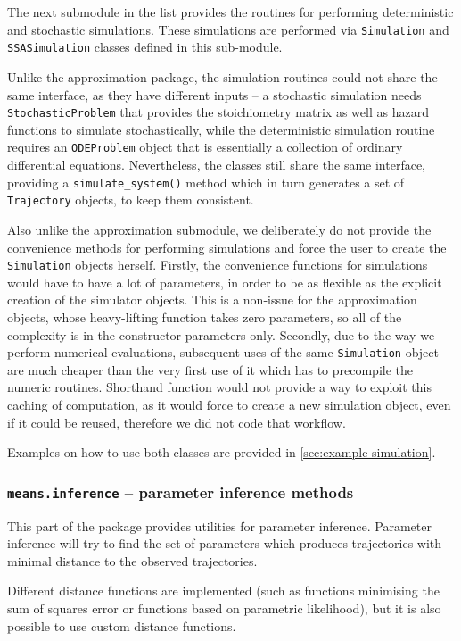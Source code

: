 The next submodule in the list provides the routines for performing deterministic and stochastic simulations.
These simulations are performed via \verb"Simulation" and \verb"SSASimulation" classes defined in this sub-module.

Unlike the approximation package, the simulation routines could not share the same interface, as they have different inputs -- a stochastic simulation needs \verb"StochasticProblem" that provides the stoichiometry matrix as well as hazard functions to simulate stochastically, while the deterministic simulation routine requires an \verb"ODEProblem" object that is essentially a collection of ordinary differential equations.
Nevertheless, the classes still share the same interface, providing a \verb"simulate_system()" method which in turn generates a set of \verb"Trajectory" objects, to keep them consistent.

Also unlike the approximation submodule, we deliberately do not provide the convenience methods for performing simulations and force the user to create the \verb"Simulation" objects herself. 
Firstly, the convenience functions for simulations would have to have a lot of parameters, in order to be as flexible as the explicit creation of the simulator objects. 
This is a non-issue for the approximation objects, whose heavy-lifting function takes zero parameters, so all of the complexity is in the constructor parameters only.
Secondly, due to the way we perform numerical evaluations, subsequent uses of the same \verb"Simulation" object are much cheaper than the very first use of it which has to precompile the numeric routines. 
Shorthand function would not provide a way to exploit this caching of computation, as it would force to create a new simulation object, even if it could be reused, therefore we did not code that workflow.

Examples on how to use both classes are provided in \autoref{sec:example-simulation}.

\subsubsection{{\tt means.inference} -- parameter inference methods}
This part of the package provides utilities for parameter inference.
Parameter inference will try to find the set of parameters which
produces trajectories with minimal distance to the observed trajectories.

Different distance functions are implemented (such as functions minimising the sum of squares error
or functions based on parametric likelihood), but it is also possible to use custom distance functions.

